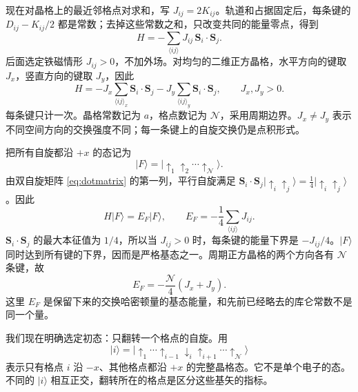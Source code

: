 \documentclass[UTF8,11pt,a4paper,fontset=fandol]{ctexart}
\newcommand{\ket}[1]{\lvert #1\rangle}
\begin{document}
现在对晶格上的最近邻格点对求和，写 $J_{ij}=2K_{ij}$。轨道和占据固定后，每条键的 $D_{ij}-K_{ij}/2$ 都是常数；去掉这些常数之和，只改变共同的能量零点，得到
\begin{equation}
\boxed{
H=-\sum_{\langle ij\rangle}J_{ij}\,\mathbf S_i\cdot\mathbf S_j.
}
\label{eq:latticeH}
\end{equation}
后面选定铁磁情形 $J_{ij}>0$，不加外场。对均匀的二维正方晶格，水平方向的键取 $J_x$，竖直方向的键取 $J_y$，因此
\begin{equation}
H=-J_x\sum_{\langle ij\rangle_x}\mathbf S_i\cdot\mathbf S_j
-J_y\sum_{\langle ij\rangle_y}\mathbf S_i\cdot\mathbf S_j,
\qquad J_x,J_y>0.
\label{eq:squareH}
\end{equation}
每条键只计一次。晶格常数记为 $a$，格点数记为 $\mathcal N$，采用周期边界。$J_x\neq J_y$ 表示不同空间方向的交换强度不同；每一条键上的自旋交换仍是点积形式。

把所有自旋都沿 $+x$ 的态记为
\begin{equation}
\ket{F}=\ket{\uparrow_1\uparrow_2\cdots\uparrow_{\mathcal N}}.
\end{equation}
由双自旋矩阵 \eqref{eq:dotmatrix} 的第一列，平行自旋满足
$\mathbf S_i\cdot\mathbf S_j\ket{\uparrow_i\uparrow_j}
=\tfrac14\ket{\uparrow_i\uparrow_j}$。因此
\begin{equation}
H\ket{F}=E_F\ket{F},
\qquad
E_F=-\frac14\sum_{\langle ij\rangle}J_{ij}.
\label{eq:EFgeneral}
\end{equation}
$\mathbf S_i\cdot\mathbf S_j$ 的最大本征值为 $1/4$，所以当 $J_{ij}>0$ 时，每条键的能量下界是 $-J_{ij}/4$。$\ket{F}$ 同时达到所有键的下界，因而是严格基态之一。周期正方晶格的两个方向各有 $\mathcal N$ 条键，故
\begin{equation}
\boxed{E_F=-\frac{\mathcal N}{4}(J_x+J_y).}
\label{eq:EF}
\end{equation}
这里 $E_F$ 是保留下来的交换哈密顿量的基态能量，和先前已经略去的库仑常数不是同一个量。

我们现在明确选定初态：只翻转一个格点的自旋。用
\begin{equation}
\ket{i}=
\ket{\uparrow_1\cdots\uparrow_{i-1}\downarrow_i
\uparrow_{i+1}\cdots\uparrow_{\mathcal N}}
\label{eq:oneflip}
\end{equation}
表示只有格点 $i$ 沿 $-x$、其他格点都沿 $+x$ 的完整晶格态。它不是单个电子的态。不同的 $\ket{i}$ 相互正交，翻转所在的格点是区分这些基矢的指标。
\end{document}
